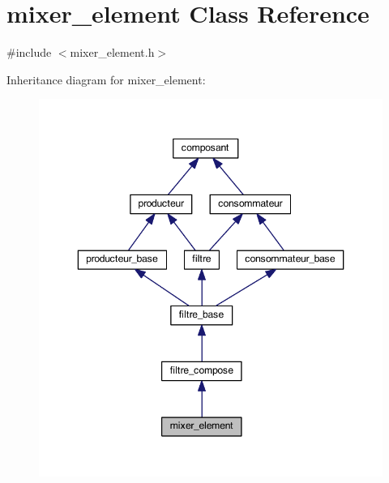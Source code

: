 \hypertarget{classmixer__element}{\section{mixer\-\_\-element Class Reference}
\label{classmixer__element}
}


{\ttfamily \#include $<$mixer\-\_\-element.\-h$>$}



Inheritance diagram for mixer\-\_\-element\-:
\nopagebreak
\begin{figure}[H]
\begin{center}
\leavevmode
\includegraphics[width=346pt]{classmixer__element__inherit__graph}
\end{center}
\end{figure}


